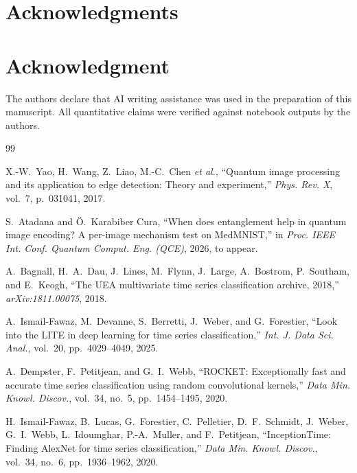 \documentclass[conference,compsoc]{IEEEtran}
\begin{document}
\ifCLASSOPTIONcompsoc
  \section*{Acknowledgments}
\else
  \section*{Acknowledgment}
\fi

The authors declare that AI writing assistance was used in the
preparation of this manuscript. All quantitative claims were verified
against notebook outputs by the authors.

\begin{thebibliography}{99}

X.-W.~Yao, H.~Wang, Z.~Liao, M.-C.~Chen \emph{et al.},
``Quantum image processing and its application to edge detection:
Theory and experiment,''
\emph{Phys. Rev. X}, vol.~7, p.~031041, 2017.

S.~Atadana and Ö.~Karabiber Cura,
``When does entanglement help in quantum image encoding?
A per-image mechanism test on {MedMNIST},''
in \emph{Proc. IEEE Int. Conf. Quantum Comput. Eng. (QCE)}, 2026,
to appear.

A.~Bagnall, H.~A.~Dau, J.~Lines, M.~Flynn, J.~Large, A.~Bostrom,
P.~Southam, and E.~Keogh,
``The {UEA} multivariate time series classification archive, 2018,''
\emph{arXiv:1811.00075}, 2018.

A.~Ismail-Fawaz, M.~Devanne, S.~Berretti, J.~Weber, and G.~Forestier,
``Look into the {LITE} in deep learning for time series classification,''
\emph{Int. J. Data Sci. Anal.}, vol.~20, pp.~4029--4049, 2025.

A.~Dempster, F.~Petitjean, and G.~I.~Webb,
``{ROCKET}: Exceptionally fast and accurate time series classification
using random convolutional kernels,''
\emph{Data Min. Knowl. Discov.}, vol.~34, no.~5, pp.~1454--1495, 2020.

H.~Ismail-Fawaz, B.~Lucas, G.~Forestier, C.~Pelletier, D.~F.~Schmidt,
J.~Weber, G.~I.~Webb, L.~Idoumghar, P.-A.~Muller, and F.~Petitjean,
``{InceptionTime}: Finding {AlexNet} for time series classification,''
\emph{Data Min. Knowl. Discov.}, vol.~34, no.~6, pp.~1936--1962, 2020.


\end{thebibliography}
\end{document}
